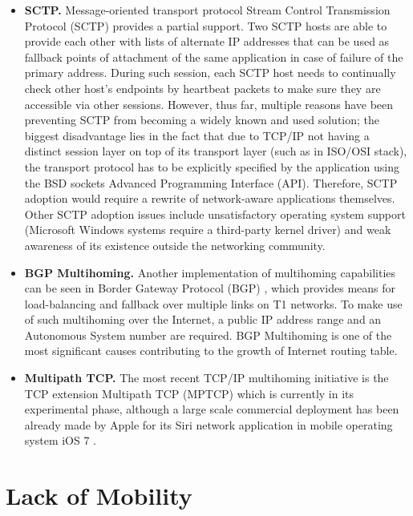         \begin{itemize}
            \item \textbf{SCTP.}
            Message-oriented transport protocol Stream Control Transmission Protocol (SCTP) \cite{rfc4960} provides a partial support. Two SCTP hosts are able to provide each other with lists of alternate IP addresses that can be used as fallback points of attachment of the same application in case of failure of the primary address. During such session, each SCTP host needs to continually check other host's endpoints by heartbeat packets to make sure they are accessible via other sessions.
            However, thus far, multiple reasons have been preventing SCTP from becoming a widely known and used solution; the biggest disadvantage lies in the fact that due to TCP/IP not having a distinct session layer on top of its transport layer (such as in ISO/OSI stack), the transport protocol has to be explicitly specified by the application using the BSD sockets Advanced Programming Interface (API). Therefore, SCTP adoption would require a rewrite of network-aware applications themselves. Other SCTP adoption issues include unsatisfactory operating system support (Microsoft Windows systems require a third-party kernel driver) and weak awareness of its existence outside the networking community.

            \item \textbf{BGP Multihoming.} Another implementation of multihoming capabilities can be seen in Border Gateway Protocol (BGP) \cite{rfc4271}, which provides means for load-balancing and fallback over multiple links on T1 networks. To make use of such multihoming over the Internet, a public IP address range and an Autonomous System number are required. BGP Multihoming is one of the most significant causes contributing to the growth of Internet routing table.

            \item \textbf{Multipath TCP.} The most recent TCP/IP multihoming initiative is the TCP extension Multipath TCP (MPTCP) which is currently in its experimental phase, although a large scale commercial deployment has been already made by Apple for its Siri network application in mobile operating system iOS 7 \cite{Apple_MP}.
        \end{itemize}

    \section{Lack of Mobility}\label{problems:mobility}

